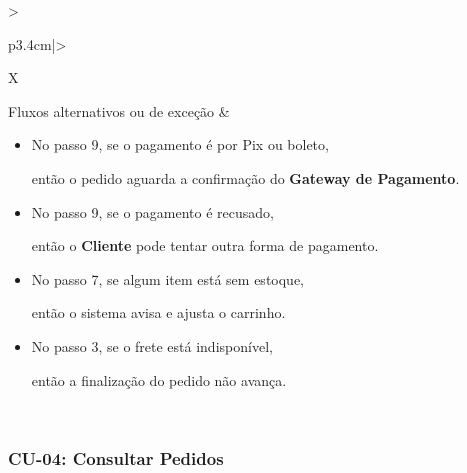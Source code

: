 \documentclass[12pt,a4paper]{article}
\begin{document}
{\begin{xltabular}{\textwidth}{>{\raggedright\arraybackslash}p{3.4cm}|>{\raggedright\arraybackslash}X}
Fluxos alternativos ou de exceção & \begin{itemize}[nosep,leftmargin=2.2em,labelwidth=2.2em,labelsep=0pt,align=left,itemsep=4pt,before=\vspace{-\baselineskip},after=\vspace{-0.4\baselineskip}]\item[\textbf{A1}] No passo 9, se o pagamento é por Pix ou boleto,\par então o pedido aguarda a confirmação do \textbf{Gateway de Pagamento}. \item[\textbf{E1}] No passo 9, se o pagamento é recusado,\par então o \textbf{Cliente} pode tentar outra forma de pagamento. \item[\textbf{E2}] No passo 7, se algum item está sem estoque,\par então o sistema avisa e ajusta o carrinho. \item[\textbf{E3}] No passo 3, se o frete está indisponível,\par então a finalização do pedido não avança.\end{itemize}\\ \bottomrule
\end{xltabular}}

\Needspace{320pt}
\subsubsection{CU-04: Consultar Pedidos}
\end{document}
